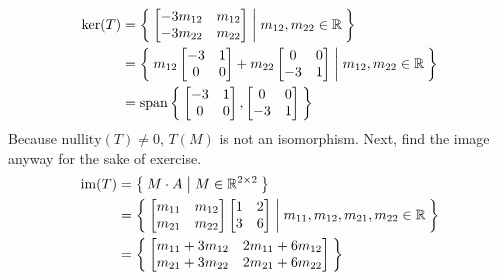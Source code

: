 \documentclass[letterpaper,12pt]{article}
\begin{document}
\begin{enumerate}
\begin{align*}
    \end{align*}
    \begin{align*}
      \text{ker}(T) &= \Set{
        \begin{bmatrix}
          -3m_{12} & m_{12} \\
          -3m_{22} & m_{22} \\
        \end{bmatrix}
        | m_{12}, m_{22} \in \mathbb{R}
      } \\
      &= \Set{
        m_{12}\begin{bmatrix}
          -3 & 1 \\
          0 & 0
        \end{bmatrix} +
        m_{22}\begin{bmatrix}
          0 & 0 \\
          -3 & 1
        \end{bmatrix}
        | m_{12}, m_{22} \in \mathbb{R}
      } \\
      &= \text{span}\Set{
        \begin{bmatrix}
          -3 & 1 \\
          0 & 0
        \end{bmatrix},
        \begin{bmatrix}
          0 & 0 \\
          -3 & 1
        \end{bmatrix}
      }
    \end{align*}
    Because $\text{nullity}(T) \ne 0$, $T(M)$ is not an isomorphism. Next, find the image anyway for the sake of exercise.
    \begin{align*}
      \text{im}(T) &= \Set{
        M \cdot A
        | M \in \mathbb{R}^{2 \times 2}
      } \\
      &= \Set{
        \begin{bmatrix}
          m_{11} & m_{12} \\
          m_{21} & m_{22}
        \end{bmatrix}
        \begin{bmatrix}
          1 & 2 \\
          3 & 6
        \end{bmatrix}
        | m_{11}, m_{12}, m_{21}, m_{22} \in \mathbb{R}
      } \\
      &= \Set{
        \begin{bmatrix}
          m_{11} + 3m_{12} & 2m_{11} + 6m_{12} \\
          m_{21} + 3m_{22} & 2m_{21} + 6m_{22}

\end{bmatrix}}
\end{align*}
\end{enumerate}
\end{document}
